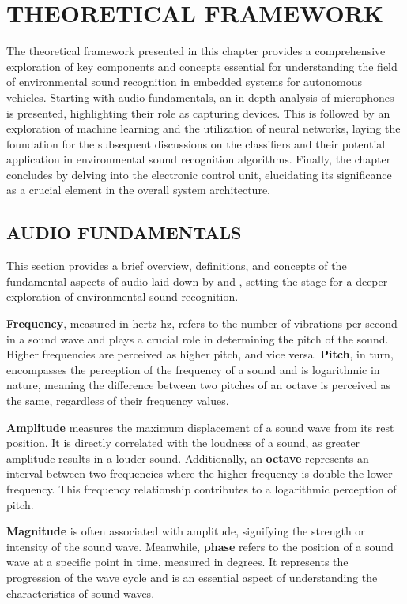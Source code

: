 \chapter{THEORETICAL FRAMEWORK}
\label{chp:frmwk}

The theoretical framework presented in this chapter provides a comprehensive exploration of key components and concepts essential for understanding the field of environmental sound recognition in embedded systems for autonomous vehicles. Starting with audio fundamentals, an in-depth analysis of microphones is presented, highlighting their role as capturing devices. This is followed by an exploration of machine learning and the utilization of neural networks, laying the foundation for the subsequent discussions on the classifiers and their potential application in environmental sound recognition algorithms. Finally, the chapter concludes by delving into the electronic control unit, elucidating its significance as a crucial element in the overall system architecture. 


\section{AUDIO FUNDAMENTALS}
\label{sec:frmwk_audio_fund}

This section provides a brief overview, definitions, and concepts of the fundamental aspects of audio laid down by \textcite{Mueller2016} and \textcite{Pelgrom2018}, setting the stage for a deeper exploration of environmental sound recognition.

\textbf{Frequency}, measured in hertz \gls{hz}, refers to the number of vibrations per second in a sound wave and plays a crucial role in determining the pitch of the sound. Higher frequencies are perceived as higher pitch, and vice versa. \textbf{Pitch}, in turn, encompasses the perception of the frequency of a sound and is logarithmic in nature, meaning the difference between two pitches of an octave is perceived as the same, regardless of their frequency values.

\textbf{Amplitude} measures the maximum displacement of a sound wave from its rest position. It is directly correlated with the loudness of a sound, as greater amplitude results in a louder sound. Additionally, an \textbf{octave} represents an interval between two frequencies where the higher frequency is double the lower frequency. This frequency relationship contributes to a logarithmic perception of pitch.

\textbf{Magnitude} is often associated with amplitude, signifying the strength or intensity of the sound wave. Meanwhile, \textbf{phase} refers to the position of a sound wave at a specific point in time, measured in degrees. It represents the progression of the wave cycle and is an essential aspect of understanding the characteristics of sound waves.

